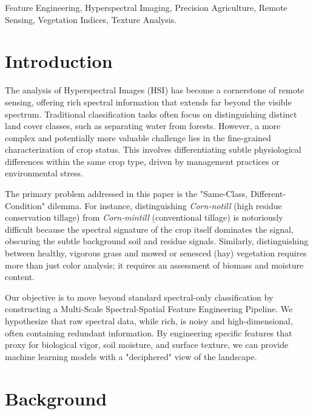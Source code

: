 \documentclass[conference]{IEEEtran}
\begin{document}
\begin{IEEEkeywords}
Feature Engineering, Hyperspectral Imaging, Precision Agriculture, Remote Sensing, Vegetation Indices, Texture Analysis.
\end{IEEEkeywords}

\section{Introduction}
\label{sec:intro}

The analysis of Hyperspectral Images (HSI) has become a cornerstone of remote sensing, offering rich spectral information that extends far beyond the visible spectrum. Traditional classification tasks often focus on distinguishing distinct land cover classes, such as separating water from forests. However, a more complex and potentially more valuable challenge lies in the fine-grained characterization of crop status. This involves differentiating subtle physiological differences within the same crop type, driven by management practices or environmental stress.

The primary problem addressed in this paper is the "Same-Class, Different-Condition" dilemma. For instance, distinguishing \textit{Corn-notill} (high residue conservation tillage) from \textit{Corn-mintill} (conventional tillage) is notoriously difficult because the spectral signature of the crop itself dominates the signal, obscuring the subtle background soil and residue signals. Similarly, distinguishing between healthy, vigorous grass and mowed or senesced (hay) vegetation requires more than just color analysis; it requires an assessment of biomass and moisture content.

Our objective is to move beyond standard spectral-only classification by constructing a Multi-Scale Spectral-Spatial Feature Engineering Pipeline. We hypothesize that raw spectral data, while rich, is noisy and high-dimensional, often containing redundant information. By engineering specific features that proxy for biological vigor, soil moisture, and surface texture, we can provide machine learning models with a "deciphered" view of the landscape.

\section{Background}
\end{document}
